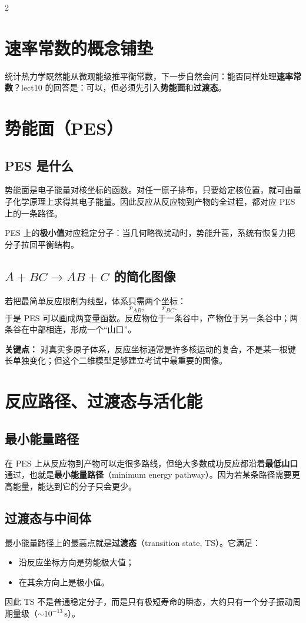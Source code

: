 \documentclass[a4paper,9pt]{article}
\newenvironment{keypoint}
{\par\vspace{0.3em}\noindent\begin{tcolorbox}[colback=keybg,colframe=keycolor,boxrule=0.5pt,arc=2pt,left=2pt,right=2pt,top=2pt,bottom=2pt,boxsep=0pt]\noindent\textcolor{keycolor}{\textbf{关键点：}}}
{\end{tcolorbox}\par\vspace{0.3em}}
\begin{document}
\begin{multicols}{2}
\section{速率常数的概念铺垫}

统计热力学既然能从微观能级推平衡常数，下一步自然会问：能否同样处理\textbf{速率常数}？lect10 的回答是：可以，但必须先引入\textbf{势能面}和\textbf{过渡态}。

\section{势能面（PES）}

\subsection{PES 是什么}
势能面是电子能量对核坐标的函数。对任一原子排布，只要给定核位置，就可由量子化学原理上求得其电子能量。因此反应从反应物到产物的全过程，都对应 PES 上的一条路径。

PES 上的\textbf{极小值}对应稳定分子：当几何略微扰动时，势能升高，系统有恢复力把分子拉回平衡结构。

\subsection{$A+BC\to AB+C$ 的简化图像}
若把最简单反应限制为线型，体系只需两个坐标：
\[
r_{AB},\qquad r_{BC}.
\]
于是 PES 可以画成两变量函数。反应物位于一条谷中，产物位于另一条谷中；两条谷在中部相连，形成一个“山口”。

\begin{keypoint}
对真实多原子体系，反应坐标通常是许多核运动的复合，不是某一根键长单独变化；但这个二维模型足够建立考试中最重要的图像。
\end{keypoint}

\section{反应路径、过渡态与活化能}

\subsection{最小能量路径}
在 PES 上从反应物到产物可以走很多路线，但绝大多数成功反应都沿着\textbf{最低山口}通过，也就是\textbf{最小能量路径}（minimum energy pathway）。因为若某条路径需要更高能量，能达到它的分子只会更少。

\subsection{过渡态与中间体}
最小能量路径上的最高点就是\textbf{过渡态}（transition state, TS）。它满足：
\begin{itemize}
  \item 沿反应坐标方向是势能极大值；
  \item 在其余方向上是极小值。
\end{itemize}
因此 TS 不是普通稳定分子，而是只有极短寿命的瞬态，大约只有一个分子振动周期量级（$\sim 10^{-13}\,\mathrm s$）。


\end{multicols}
\end{document}

